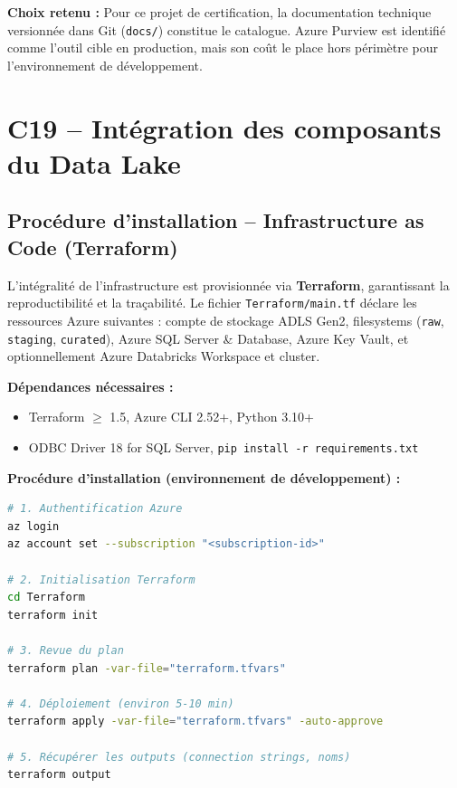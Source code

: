 \documentclass[12pt,a4paper]{article}
\begin{document}
\textbf{Choix retenu :} Pour ce projet de certification, la documentation technique versionnée dans Git (\texttt{docs/}) constitue le catalogue. Azure Purview est identifié comme l'outil cible en production, mais son coût le place hors périmètre pour l'environnement de développement.

\newpage
\section{C19 -- Intégration des composants du Data Lake}

\subsection{Procédure d'installation -- Infrastructure as Code (Terraform)}

L'intégralité de l'infrastructure est provisionnée via \textbf{Terraform}, garantissant la reproductibilité et la traçabilité. Le fichier \texttt{Terraform/main.tf} déclare les ressources Azure suivantes : compte de stockage ADLS Gen2, filesystems (\texttt{raw}, \texttt{staging}, \texttt{curated}), Azure SQL Server \& Database, Azure Key Vault, et optionnellement Azure Databricks Workspace et cluster.

\textbf{Dépendances nécessaires :}
\begin{itemize}
  \item Terraform $\geq$ 1.5, Azure CLI 2.52+, Python 3.10+
  \item ODBC Driver 18 for SQL Server, \texttt{pip install -r requirements.txt}
\end{itemize}

\textbf{Procédure d'installation (environnement de développement) :}

\begin{lstlisting}[language=bash, caption=Deploiement complet de l'infrastructure]
# 1. Authentification Azure
az login
az account set --subscription "<subscription-id>"

# 2. Initialisation Terraform
cd Terraform
terraform init

# 3. Revue du plan
terraform plan -var-file="terraform.tfvars"

# 4. Déploiement (environ 5-10 min)
terraform apply -var-file="terraform.tfvars" -auto-approve

# 5. Récupérer les outputs (connection strings, noms)
terraform output
\end{lstlisting}
\end{document}
